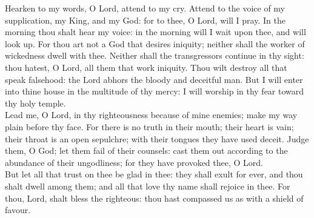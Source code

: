 
Hearken to my words, O Lord, attend to my cry. Attend to the voice of my supplication, my King, and my God: for to thee, O Lord, will I pray. In the morning thou shalt hear my voice: in the morning will I wait upon thee, and will look up. For thou art not a God that desires iniquity; neither shall the worker of wickedness dwell with thee. Neither shall the transgressors continue in thy sight: thou hatest, O Lord, all them that work iniquity. Thou wilt destroy all that speak falsehood: the Lord abhors the bloody and deceitful man. But I will enter into thine house in the multitude of thy mercy: I will worship in thy fear toward thy holy temple.\\ 

\noindent
Lead me, O Lord, in thy righteousness because of mine enemies; make my way plain before thy face. For there is no truth in their mouth; their heart is vain; their throat is an open sepulchre; with their tongues they have used deceit. Judge them, O God; let them fail of their counsels: cast them out according to the abundance of their ungodliness; for they have provoked thee, O Lord.\\

\noindent
But let all that trust on thee be glad in thee: they shall exult for ever, and thou shalt dwell among them; and all that love thy name shall rejoice in thee. For thou, Lord, shalt bless the righteous: thou hast compassed us as with a shield of favour.